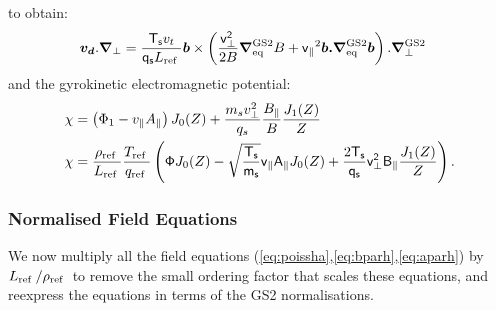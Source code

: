 \documentclass[10pt,a4paper]{article}
\newcommand{\grad}{{\bfm \nabla}}
\newcommand{\bfm}[1]{\mbox{{\boldmath $ { #1}$}}}
\newcommand{\gradeq}{\bfm{\nabla}^{\rm GS2}_{\rm eq}}
\newcommand{\gperp}{\bfm{\nabla}^{\rm GS2}_{\perp}}
\newcommand{\n}[1]{{#1}_{\rm ref\;}}
\newcommand{\g}[1]{\mathsf{#1}}
\begin{document}
to obtain:
\begin{align}
  \bfm{v_d}.\grad_{\perp} & = \frac{\g{T_s} v_t}{\g{q_s}\n{L}} \bfm{b} \times
  \left( \frac{\g{v_{\perp}^2}}{2B} \gradeq{B} + \g{v_{\parallel}}^2
    \bfm{b.}\gradeq \bfm{b} \right).\gperp
\label{eq:vdnorm}
\end{align}
and the gyrokinetic electromagnetic potential:
\begin{align}
  \chi & = \left( \Phi_1 - v_{\parallel} A_{\parallel} \right) J_0(Z) +
  \frac{m_s v_{\perp}^2}{q_s} \frac{B_{\parallel}}{B} \frac{J_1(Z)}{Z}
  \nonumber \\
  \chi & = \frac{\n{\rho}}{\n{L}} \frac{\n{T}}{\n{q}} \left( \g{\Phi} J_0(Z) -
    \sqrt{\frac{\g{T_s}}{\g{m_s}}} \g{v_{\parallel}} \g{A_{\parallel}} J_0(Z)
    + \frac{2 \g{T_s}}{\g{q_s}} \g{v_{\perp}^2} \g{B_{\parallel}}
    \frac{J_1(Z)}{Z} \right) \label{eq:chinorm}.
\end{align}

\linespread{1}
\normalsize
\subsubsection{Normalised Field Equations}

We now multiply all the field equations
(\ref{eq:poissha},\ref{eq:bparh},\ref{eq:aparh}) by $\n{L}/\n{\rho}$ to remove
the small ordering factor that scales these equations, and reexpress the
equations in terms of the GS2 normalisations.
\end{document}
